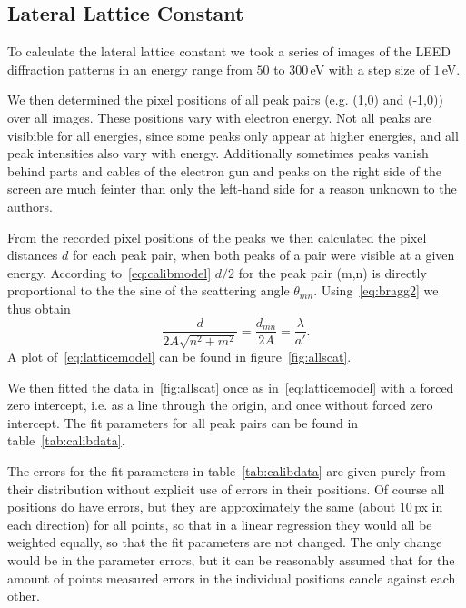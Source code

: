 \documentclass[a4paper,10pt]{scrartcl}
\begin{document}
\subsection{Lateral Lattice Constant}

To calculate the lateral lattice constant we took a series of images of the LEED diffraction patterns in an energy range from $50$ to $300\,$eV with a step size of $1\,$eV. 

We then determined the pixel positions of all peak pairs (e.g. (1,0) and (-1,0)) over all images. These positions vary with electron energy. Not all peaks are visibible for all energies, since some peaks only appear at higher energies, and all peak intensities also vary with energy. Additionally sometimes peaks vanish behind parts and cables of the electron gun and peaks on the right side of the screen are much feinter than only the left-hand side for a reason unknown to the authors.

From the recorded pixel positions of the peaks we then calculated the pixel distances $d$ for each peak pair, when both peaks of a pair were visible at a given energy. According to~\eqref{eq:calibmodel} $d/2$ for the peak pair (m,n) is directly proportional to the the sine of the scattering angle $\theta_{mn}$. Using~\eqref{eq:bragg2} we thus obtain
\begin{equation}
\frac{d}{2 A \sqrt{n^2 + m^2}} = \frac{d_{mn}}{2A} = \frac{\lambda}{a'}. \label{eq:latticemodel}
\end{equation}
A plot of~\eqref{eq:latticemodel} can be found in figure~\ref{fig:allscat}.

We then fitted the data in~\ref{fig:allscat} once as in~\eqref{eq:latticemodel} with a forced zero intercept, i.e. as a line through the origin, and once without forced zero intercept. The fit parameters for all peak pairs can be found in table~\ref{tab:calibdata}.

The errors for the fit parameters in table~\ref{tab:calibdata} are given purely from their distribution without explicit use of errors in their positions. Of course all positions do have errors, but they are approximately the same (about $10\,$px in each direction) for all points, so that in a linear regression they would all be weighted equally, so that the fit parameters are not changed. The only change would be in the parameter errors, but it can be reasonably assumed that for the amount of points measured errors in the individual positions cancle against each other.
\end{document}
